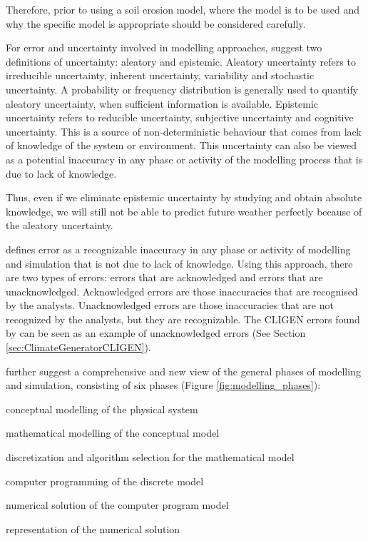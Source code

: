 Therefore, prior to using a soil erosion model, where the model is to be
used and why the specific model is appropriate should be considered carefully.

For error and uncertainty involved in modelling approaches,
\citet{oberkampf2002-333} suggest two definitions of uncertainty: aleatory and
epistemic.
Aleatory uncertainty refers to irreducible uncertainty, inherent uncertainty,
variability and stochastic uncertainty. A probability or frequency distribution
is generally used to quantify aleatory uncertainty, when sufficient information
is available.
Epistemic uncertainty refers to reducible uncertainty, subjective uncertainty
and cognitive uncertainty. This is a source of non-deterministic behaviour that
comes from lack of knowledge of the system or environment. This uncertainty can
also be viewed as a potential inaccuracy in any phase or activity of the
modelling process that is due to lack of knowledge.

Thus, even if we eliminate epistemic uncertainty by studying and obtain absolute
knowledge, we will still not be able to predict future weather perfectly because
of the aleatory uncertainty.

\citet{oberkampf2002-333} defines error as a recognizable inaccuracy in any
phase or activity of modelling and simulation that is not due to lack of
knowledge. Using this approach, there are two types of errors: errors that are
acknowledged and errors that are unacknowledged. Acknowledged errors are
those inaccuracies that are recognised by the analysts. Unacknowledged errors
are those inaccuracies that are not recognized by the analysts, but they are
recognizable. The CLIGEN errors found by \citet{yu2000-301} can be seen as an
example of unacknowledged errors (See Section \ref{sec:ClimateGeneratorCLIGEN}).

\citet{oberkampf2002-333} further suggest a comprehensive and new view of the
general phases of modelling and simulation, consisting of six phases (Figure
\ref{fig:modelling_phases}):
\begin{enumerate*}
  \item conceptual modelling of the physical system
  \item mathematical modelling of the conceptual model
  \item discretization and algorithm selection for the mathematical model
  \item computer programming of the discrete model
  \item numerical solution of the computer program model
  \item representation of the numerical solution
\end{enumerate*}

